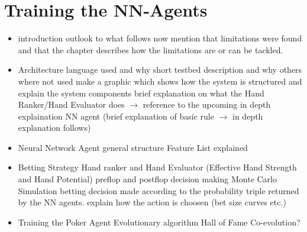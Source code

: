 \section{Training the NN-Agents}
\pagebreak
\begin{itemize}
\item introduction
\subitem outlook to what follows now
\subitem mention that limitations were found and that the chapter describes how the limitations are or can be tackled.
\item Architecture
\subitem language used and why
\subitem short testbed description and why others where not used
\subitem make a graphic which shows how the system is structured and explain the system components
\subsubitem brief explanation on what the Hand Ranker/Hand Evaluator does $\rightarrow$ reference to the upcoming in depth explaination
\subsubitem NN agent (brief explanation of basic rule $\rightarrow$ in depth explanation follows)
\item Neural Network Agent
\subitem general structure
\subitem Feature List explained
\item Betting Strategy
\subitem Hand ranker and Hand Evaluator (Effective Hand Strength and Hand Potential)
\subitem preflop and postflop decision making
\subsubitem Monte Carlo Simulation
\subitem betting decision made according to the probability triple returned by the NN agents.
\subsubitem explain how the action is choosen (bet size curves etc.)
\item Training the Poker Agent
\subitem Evolutionary algorithm
\subitem Hall of Fame
\subitem Co-evolution?
\end{itemize}
